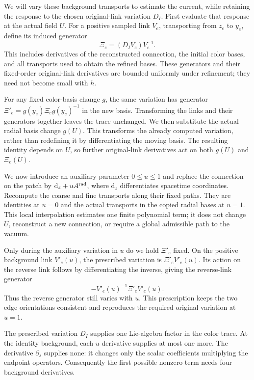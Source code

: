 \documentclass[11pt,a4paper]{article}
\theoremstyle{remark}
\newcommand{\dd}{\mathrm d}
\begin{document}
We will vary these background transports to estimate the current, while
retaining the response to the chosen original-link variation $D_I$.
First evaluate that response at the actual field $U$. For a positive
sampled link $V_e$, transporting from $z_e$ to $y_e$, define its
induced generator
\begin{equation}
 \Xi_e=(D_I V_e)V_e^{-1}.
\end{equation}
This includes derivatives of the reconstructed connection, the initial
color bases, and all transports used to obtain the refined bases. These
generators and their fixed-order original-link derivatives are bounded
uniformly under refinement; they need not become small with $h$.

For any fixed color-basis change $g$, the same variation has generator
$\Xi'_e=g(y_e)\Xi_e g(y_e)^{-1}$ in the new basis. Transforming
the links and their generators together leaves the trace unchanged.
We then substitute the actual radial basis change $g(U)$. This transforms
the already computed variation, rather than redefining it by
differentiating the moving basis. The resulting identity depends on $U$,
so further original-link derivatives act on both $g(U)$ and $\Xi_e(U)$.

We now introduce an auxiliary parameter $0\le u\le1$ and replace the
connection on the patch by $\dd_z+uA^{\rm rad}$, where $\dd_z$
differentiates spacetime coordinates. Recompute the coarse and fine
transports along their fixed paths. They are identities at $u=0$ and
the actual transports in the copied radial bases at $u=1$. This local
interpolation estimates one finite polynomial term; it does not change
$U$, reconstruct a new connection, or require a global admissible path
to the vacuum.

Only during the auxiliary variation in $u$ do we hold $\Xi'_e$ fixed.
On the positive background link $V'_e(u)$, the prescribed variation is
$\Xi'_e V'_e(u)$. Its action on the reverse link follows by
differentiating the inverse, giving the reverse-link generator
\begin{equation}
 -V'_e(u)^{-1}\Xi'_e V'_e(u).
\end{equation}
Thus the reverse generator still varies with $u$. This prescription
keeps the two edge orientations consistent and reproduces the required
original variation at $u=1$.

The prescribed variation $D_I$ supplies one Lie-algebra factor in the
color trace. At the identity background, each $u$ derivative supplies
at most one more. The derivative $\partial_s$ supplies none: it changes
only the scalar coefficients multiplying the endpoint operators.
Consequently the first possible nonzero term needs four background
derivatives.
\end{document}

